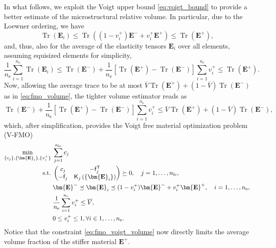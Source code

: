 \documentclass[preprint,3p]{elsarticle}
\newcommand{\tensf}[1]{\bm{\mathbf{#1}}}            %
\newcommand{\trn}{\mathsf{T}}                       %
\newcommand{\Ei}{\tensf{E}_i}                       %
\newcommand{\Emin}{\tensf{E}^{-}}                   %
\newcommand{\Emax}{\tensf{E}^{+}}                   %
\newcommand{\nel}{n_\mathrm{e}}                     %
\newcommand{\nlc}{n_\mathrm{lc}}                    %
\newcommand{\semtrx}[1]{\ifcat\noexpand#1\relax\bm{#1}\else\mathsf{#1}\fi}
\newcommand{\sevek}[1]{\ifcat\noexpand#1\relax\bm{#1}\else\mathsf{#1}\fi}
\newcommand{\Tr}{\operatorname{Tr}}
\begin{document}
In what follows, we exploit the Voigt upper bound \eqref{eq:voigt_bound} to provide a better estimate of the microstructural relative volume. In particular, due to the Loewner ordering, we have
%
\begin{equation}
    \Tr(\Ei) \le \Tr((1-v_i^+) \Emin + v_i^+ \Emax) \le \Tr(\Emax),
\end{equation}
%
and, thus, also for the average of the elasticity tensors $\Ei$ over all elements, assuming equisized elements for simplicity,
%
\begin{equation}\label{eq:fmo_volume_average}
    \frac{1}{\nel}\sum_{i=1}^{\nel} \Tr(\Ei) \le \Tr(\Emin) + \frac{1}{\nel}[\Tr(\Emax)-\Tr(\Emin)] \sum_{i=1}^{\nel} v_i^+ \le \Tr(\Emax).
\end{equation}
%
Now, allowing the average trace to be at most $\overline{V}\Tr(\Emax) + (1-\overline{V}) \Tr(\Emin)$ as in \eqref{eq:fmo_volume}, the tighter volume estimator reads as
%
\begin{equation}\label{eq:fmo_voigt_volume_original}
    \Tr(\Emin) + \frac{1}{\nel}[\Tr(\Emax)-\Tr(\Emin)] \sum_{i=1}^{\nel} v_i^+ \le \overline{V} \Tr(\Emax) + (1-\overline{V}) \Tr(\Emin),
\end{equation}
%
which, after simplification, provides the Voigt free material optimization problem (V-FMO)
%
\begin{subequations}\label{eq:fmo_voigt}
\begin{align}
    \min_{\{c_j\}, \{\Ei\}, \{v_i^+\}} \; & \sum_{j=1}^{\nlc} c_j \label{eq:fmo_voigt_compliance}\\
    \mathrm{s.t.}\; & \begin{pmatrix}
        c_j & -\sevek{f}_j^\trn\\
        -\sevek{f}_j & \semtrx{K}_j\left(\{\Ei\}\right)
    \end{pmatrix}\succeq 0, \quad j = 1,\dots,\nlc,\label{eq:fmo_voigt_lmi}\\
    & \Emin \preceq \Ei \preceq (1-v_i^+) \Emin + v_i^+ \Emax, \quad i = 1,\dots,\nel,\label{eq:fmo_voigt_fo}\\
    & \frac{1}{\nel}\sum_{i=1}^{\nel} v_i^+ \le \overline{V},\label{eq:fmo_voigt_volume}\\
    & 0 \le v_i^+ \le 1, \forall i \in 1,\dots,\nel.
\end{align}
\end{subequations}
%
Notice that the constraint \eqref{eq:fmo_voigt_volume} now directly limits the average volume fraction of the stiffer material $\Emax$.
\end{document}

